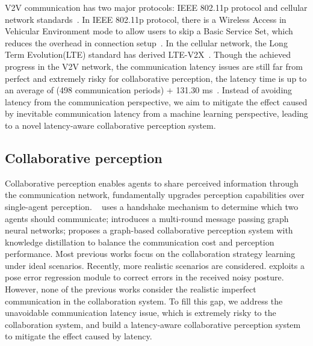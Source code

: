 \documentclass[runningheads]{llncs}
\begin{document}
V2V communication has two major protocols: IEEE 802.11p protocol and cellular network standards~\cite{Mei2018ALA}. 
In IEEE 802.11p protocol, there is a Wireless Access in Vehicular Environment mode to allow users to skip a Basic Service Set, which reduces the overhead in connection setup~\cite{Jiang2008IEEE8T}. In the cellular network, the Long Term Evolution(LTE) standard has derived LTE-V2X~\cite{Araniti2013LTEFV}. Though the achieved progress in the V2V network, the communication latency issues are still far from perfect and extremely risky for collaborative perception, the latency time is up to an average of (498 communication periods) + 131.30 ms~\cite{latency}. Instead of avoiding latency from the communication perspective, we aim to mitigate the effect caused by inevitable communication latency from a machine learning perspective, leading to a novel latency-aware collaborative perception system.

\subsection{Collaborative perception}

Collaborative perception enables agents to share perceived information through the communication network, fundamentally upgrades perception capabilities over single-agent perception.
~\cite{who2com,when2com} uses a handshake mechanism to determine which two agents should communicate; \cite{v2vnet} introduces a multi-round message passing graph neural networks; \cite{disconet} proposes a graph-based collaborative perception system with knowledge distillation to balance the communication cost and perception performance.
Most previous works focus on the collaboration strategy learning under ideal scenarios. Recently, more realistic scenarios are considered. \cite{pose} exploits a pose error regression module to correct errors in the received noisy posture. However, none of the previous works consider the realistic imperfect communication in the collaboration system. To fill this gap, we address the unavoidable communication latency issue, which is extremely risky to the collaboration system, and build a latency-aware collaborative perception system to mitigate the effect caused by latency.
\end{document}

